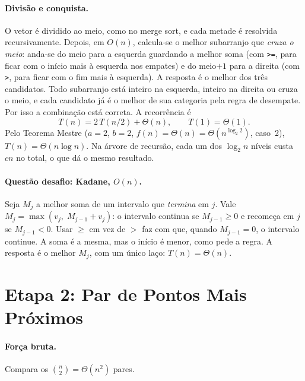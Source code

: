 \documentclass[11pt,a4paper]{article}
\begin{document}
\paragraph{Divisão e conquista.} O vetor é dividido ao meio, como no merge sort, e cada metade é resolvida recursivamente. Depois, em $O(n)$, calcula-se o melhor subarranjo que \emph{cruza o meio}: anda-se do meio para a esquerda guardando a melhor soma (com \texttt{>=}, para ficar com o início mais à esquerda nos empates) e do meio$+1$ para a direita (com \texttt{>}, para ficar com o fim mais à esquerda). A resposta é o melhor dos três candidatos. Todo subarranjo está inteiro na esquerda, inteiro na direita ou cruza o meio, e cada candidato já é o melhor de sua categoria pela regra de desempate. Por isso a combinação está correta. A recorrência é
\[
T(n) = 2\,T(n/2) + \Theta(n), \qquad T(1)=\Theta(1).
\]
Pelo Teorema Mestre ($a=2$, $b=2$, $f(n)=\Theta(n)=\Theta(n^{\log_2 2})$, caso~2), $T(n)=\Theta(n\log n)$. Na árvore de recursão, cada um dos $\log_2 n$ níveis custa $cn$ no total, o que dá o mesmo resultado.

\paragraph{Questão desafio: Kadane, $O(n)$.} Seja $M_j$ a melhor soma de um intervalo que \emph{termina} em $j$. Vale $M_j = \max(v_j,\; M_{j-1}+v_j)$: o intervalo continua se $M_{j-1}\ge 0$ e recomeça em $j$ se $M_{j-1}<0$. Usar $\ge$ em vez de $>$ faz com que, quando $M_{j-1}=0$, o intervalo continue. A soma é a mesma, mas o início é menor, como pede a regra. A resposta é o melhor $M_j$, com um único laço: $T(n)=\Theta(n)$.

\section{Etapa 2: Par de Pontos Mais Próximos}

\paragraph{Força bruta.} Compara os $\binom{n}{2}=\Theta(n^2)$ pares.
\end{document}
